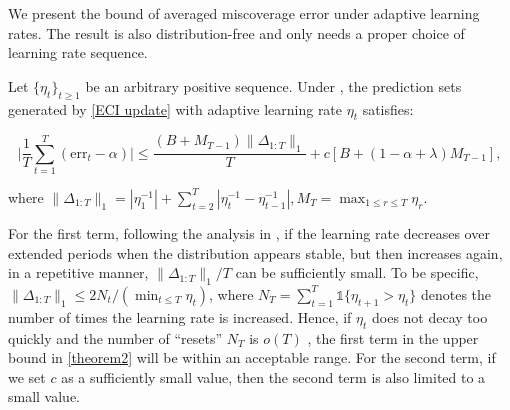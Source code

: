 We present the bound of averaged miscoverage error under adaptive learning rates. The result is also distribution-free and only needs a proper choice of learning rate sequence.
\begin{theorem}
\label{theorem2}
  Let $\{\eta_t\}_{t \geq 1}$ be an arbitrary positive sequence. Under ,  the prediction sets generated by \eqref{ECI update} with adaptive learning rate $\eta_t$ satisfies:

\begin{equation}
    \bigg|\frac{1}{T} \sum_{t=1}^T (\text{err}_t-\alpha) \bigg|  \leq  \frac{(B+M_{T-1})\|\Delta_{1:T}\|_1}{T} +c \left[B+(1-\alpha+\lambda)M_{T-1}\right],
\end{equation}

where $\|\Delta_{1:T}\|_1=|\eta_1^{-1}|+\sum_{t=2}^T|\eta_t^{-1}-\eta_{t-1}^{-1}|, M_T = \max_{1\leq r \leq T}\eta_r$.
\end{theorem}
For the first term, following the analysis in \cite{angelopoulos2024online}, if the learning rate decreases over extended periods when the distribution appears stable, but then increases again, in a repetitive manner, $\|\Delta_{1:T}\|_1/T$ can be sufficiently small. To be specific, $\|\Delta_{1:T}\|_1\leq 2N_t/(\min_{t\leq T} \eta_t)$, where $N_T=\sum_{t=1}^T \mathds{1}\{\eta_{t+1}>\eta_{t}\}$ denotes the number of times the learning rate is increased. Hence, if $\eta_t$ does not decay
too quickly and the number of “resets” $N_T$ is $o(T)$ , the first term in the upper bound in \eqref{theorem2} will be within an acceptable range. For the second term, if we set $c$  as a sufficiently small value, then the second term is also limited to a small value. 







